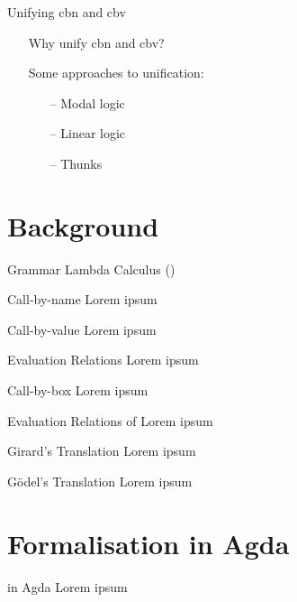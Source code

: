 \documentclass{beamer}
\theoremstyle{definition}
\begin{document}
  \begin{frame}{Unifying cbn and cbv}
    \begin{itemize}
      \item[\textbullet] Why unify cbn and cbv?
      \item[\textbullet] Some approaches to unification:
        \begin{itemize}
          \item[--] Modal logic
          \item[--] Linear logic
          \item[--] Thunks
        \end{itemize}
    \end{itemize}
  \end{frame}

  \section{Background}
  \begin{frame}{Grammar Lambda Calculus (\lc)}
    \begin{grammar}{
    }
    \end{grammar}
  \end{frame}
  \begin{frame}{Call-by-name \lc}
    Lorem ipsum
  \end{frame}
  \begin{frame}{Call-by-value \lc}
    Lorem ipsum
  \end{frame}
  \begin{frame}{Evaluation Relations}
    Lorem ipsum
  \end{frame}
  \begin{frame}{Call-by-box \lc}
    Lorem ipsum
  \end{frame}
  \begin{frame}{Evaluation Relations of \lab}
    Lorem ipsum
  \end{frame}
  \begin{frame}{Girard's Translation}
    Lorem ipsum
  \end{frame}
  \begin{frame}{Gödel's Translation}
    Lorem ipsum
  \end{frame}

  \section{Formalisation in Agda}
  \begin{frame}{\lterms in Agda}
    Lorem ipsum
  \end{frame}
  
\end{document}
